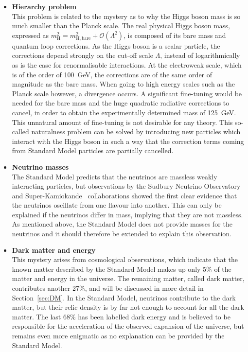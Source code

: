 \begin{itemize}
 \item[]\textbf{Hierarchy problem}\\ 
 This problem is related to the mystery as to why the Higgs boson mass is so much smaller than the Planck scale. The real physical Higgs boson mass, expressed as $m_{\mathrm{H}}^2 = m_{\mathrm{H, bare}}^2 + \mathcal{O}(\Lambda^2)$, is composed of its bare mass and quantum loop corrections. As the Higgs boson is a scalar particle, the corrections depend strongly on the cut-off scale $\Lambda$, instead of logarithmically as is the case for renormalisable interactions. At the electroweak scale, which is of the order of \SI{100}{GeV}, the corrections are of the same order of magnitude as the bare mass. When going to high energy scales such as the Planck scale however, a divergence occurs. A significant fine-tuning would be needed for the bare mass and the huge quadratic radiative corrections to cancel, in order to obtain the experimentally determined mass of \SI{125}{GeV}. This unnatural amount of fine-tuning is not desirable for any theory. This so-called naturalness problem can be solved by introducing new particles which interact with the Higgs boson in such a way that the correction terms coming from Standard Model particles are partially cancelled.
 
 \item[]\textbf{Neutrino masses}\\ 
 The Standard Model predicts that the neutrinos are massless weakly interacting particles, but observations by the Sudbury Neutrino Observatory~\cite{Ahmad:2002jz} and Super-Kamiokande~\cite{Fukuda:1998mi} collaborations showed the first clear evidence that the neutrinos oscillate from one flavour into another. This can only be explained if the neutrinos differ in mass, implying that they are not massless. As mentioned above, the Standard Model does not provide masses for the neutrinos and it should therefore be extended to explain this observation.
 
 \item[]\textbf{Dark matter and energy}\\
 This mystery arises from cosmological observations, which indicate that the known matter described by the Standard Model makes up only 5\% of the matter and energy in the universe. The remaining matter, called dark matter, contributes another 27\%, and will be discussed in more detail in Section~\ref{sec:DM}. In the Standard Model, neutrinos contribute to the dark matter, but their relic density is by far not enough to account for all the dark matter. The last 68\% has been labelled dark energy and is believed to be responsible for the acceleration of the observed expansion of the universe, but remains even more enigmatic as no explanation can be provided by the Standard Model.
\end{itemize}

